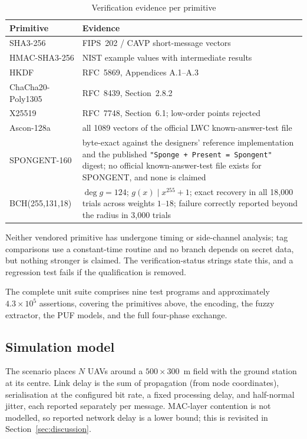 \documentclass[11pt,a4paper]{article}
\begin{document}
\begin{table}[H]
\centering
\caption{Verification evidence per primitive}
\label{tab:kat}
\small
\begin{tabular}{@{}p{3.4cm}p{8.4cm}@{}}
\toprule
\textbf{Primitive} & \textbf{Evidence} \\
\midrule
SHA3-256 & FIPS~202 / CAVP short-message vectors \\
HMAC-SHA3-256 & NIST example values with intermediate results \\
HKDF & RFC~5869, Appendices A.1--A.3 \\
ChaCha20-Poly1305 & RFC~8439, Section~2.8.2 \\
X25519 & RFC~7748, Section~6.1; low-order points rejected \\
Ascon-128a & all 1089 vectors of the official LWC known-answer-test file \\
SPONGENT-160 & byte-exact against the designers' reference implementation and the
published \texttt{"Sponge + Present = Spongent"} digest; no official
known-answer-test file exists for SPONGENT, and none is claimed \\
BCH(255,131,18) & $\deg g = 124$; $g(x) \mid x^{255}+1$; exact recovery in all
18{,}000 trials across weights $1$--$18$; failure correctly reported beyond the
radius in 3{,}000 trials \\
\bottomrule
\end{tabular}
\end{table}

Neither vendored primitive has undergone timing or side-channel analysis; tag
comparisons use a constant-time routine and no branch depends on secret data, but
nothing stronger is claimed. The verification-status strings state this, and a
regression test fails if the qualification is removed.

The complete unit suite comprises nine test programs and approximately
$4.3\times10^{5}$ assertions, covering the primitives above, the encoding, the
fuzzy extractor, the PUF models, and the full four-phase exchange.

\subsection{Simulation model}

The scenario places $N$ UAVs around a $500\times300$~m field with the ground
station at its centre. Link delay is the sum of propagation (from node
coordinates), serialisation at the configured bit rate, a fixed processing delay,
and half-normal jitter, each reported separately per message. MAC-layer contention
is not modelled, so reported network delay is a lower bound; this is revisited in
Section~\ref{sec:discussion}.
\end{document}
